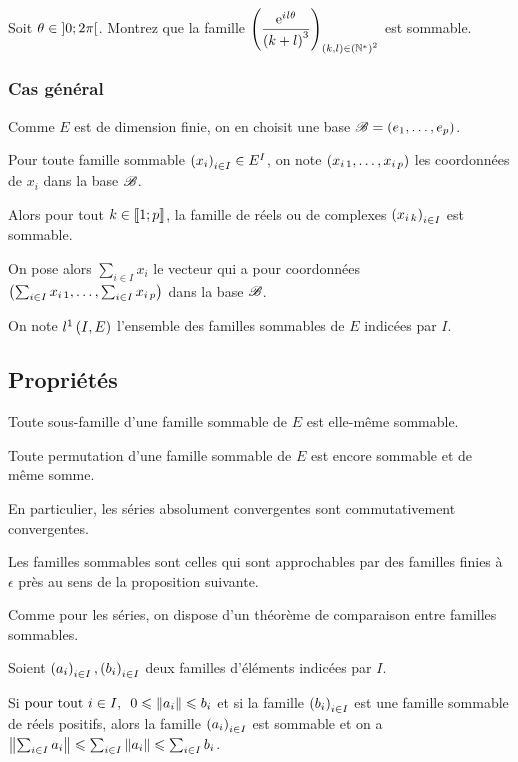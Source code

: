 \begin{exo}
Soit \(\theta\in\left]0;2\pi\right[\). Montrez que la famille \(\left(\dfrac{\mathrm{e}^{i\mkern1mu l\theta}}{\left(k+l\right)^3}\right)_{\left(k,l\right)\in\left(\mathbb{N}^*\right)^2}\) est sommable.
\end{exo}

\subsubsection{Cas général}

Comme \(E\) est de dimension finie, on en choisit une base \(\mathscr{B}=\left(e_1,\dots,e_p\right)\).

Pour toute famille sommable \(\left(x_i\right)_{i\in I}\in E^I\), on note \(\left(x_{i\,1},\dots,x_{i\,p}\right)\) les coordonnées de \(x_i\) dans la base \(\mathscr{B}\).

Alors pour tout \(k\in\left\llbracket1;p\right\rrbracket\), la famille de réels ou de complexes \(\left(x_{i\,k}\right)_{i\in I}\) est sommable.

On pose alors \(\sum_{i\in I}x_i\) le vecteur qui a pour coordonnées \(\left(\sum_{i\in I}x_{i\,1},\dots,\sum_{i\in I}x_{i\,p}\right)\) dans la base \(\mathscr{B}\).

On note \(l^1\left(I,E\right)\) l'ensemble des familles sommables de \(E\) indicées par \(I\).

\subsection{Propriétés}

\begin{prop}
Toute sous-famille d'une famille sommable de \(E\) est elle-même sommable.

Toute permutation d'une famille sommable de \(E\) est encore sommable et de même somme.
\end{prop}

En particulier, les séries absolument convergentes sont commutativement convergentes.

Les familles sommables sont celles qui sont approchables par des familles finies à \(\epsilon\) près au sens de la proposition suivante.

Comme pour les séries, on dispose d'un théorème de comparaison entre familles sommables.

\begin{prop}
Soient \(\left(a_i\right)_{i\in I},\left(b_i\right)_{i\in I}\) deux familles d'éléments indicées par \(I\).

Si \(\quantifs{\tpt i\in I}0\leq\norme{a_i}\leq b_i\) et si la famille \(\left(b_i\right)_{i\in I}\) est une famille sommable de réels positifs, alors la famille \(\left(a_i\right)_{i\in I}\) est sommable et on a \(\norme{\sum_{i\in I}a_i}\leq\sum_{i\in I}\norme{a_i}\leq\sum_{i\in I}b_i\).
\end{prop}

